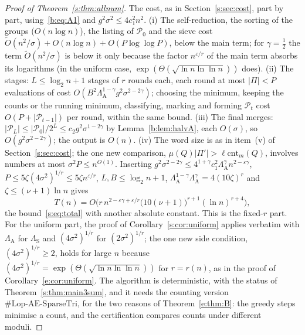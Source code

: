 \documentclass[11pt]{article}
\theoremstyle{definition}
\theoremstyle{remark}
\newcommand{\Lop}{\mathrm{Lop}\text{-}\allowbreak\mathrm{AE}\text{-}\allowbreak\mathrm{SparseTri}}
\newcommand{\cnt}{\mathrm{cnt}}
\newcommand{\Pq}{\mathcal{P}}
\begin{document}
\begin{proof}[Proof of Theorem~\ref{s:thm:allnum}]
The cost, as in Section~\ref{s:sec:cost}, part by part, using~\eqref{b:eq:A1} and $g^2\sigma^2\le4c_1^2n^2$. (i) The self-reduction, the sorting of the groups ($O(n\log n)$), the listing of $\Pq_0$ and the sieve cost $\tilde O(n^2/\sigma)+O(n\log n)+O(P\log\log P)$, below the main term; for $\gamma=\frac12$ the term $\tilde O(n^2/\sigma)$ is below it only because the factor $n^{\varepsilon/r}$ of the main term absorbs its logarithms (in the uniform case, $\exp(\Theta(\sqrt{\ln n\ln\ln n}))$ does). (ii) The stages: $L\le\log_2n+1$ stages of $r$ rounds each, each round at most $|\Pi|<P$ evaluations of cost $O(B^2\Lambda_{\mathrm A}^{1-\gamma}g^2\sigma^{2-2\gamma})$; choosing the minimum, keeping the counts or the running minimum, classifying, marking and forming $\Pq_t$ cost $O(P+|\Pq_{t-1}|)$ per round, within the same bound. (iii) The final merges: $|\Pq_L|\le|\Pq_0|/2^L\le c_2g^2\sigma^{1-2\gamma}$ by Lemma~\ref{b:lem:halvA}, each $O(\sigma)$, so $O(g^2\sigma^{2-2\gamma})$; the output is $O(n)$. (iv) The word size is as in item~(v) of Section~\ref{s:sec:cost}; the one new comparison, $\mu(Q)|\Pi'|>\ell\cnt_m(Q)$, involves numbers at most $\sigma^2P\le n^{O(1)}$. Inserting $g^2\sigma^{2-2\gamma}\le4^{1+\gamma}c_1^2\Lambda_{\mathrm A}^\gamma n^{2-\varepsilon\gamma}$, $P\le5\zeta(4\sigma^2)^{1/r}\le5\zeta n^{\varepsilon/r}$, $L,B\le\log_2n+1$, $\Lambda_{\mathrm A}^{1-\gamma}\Lambda_{\mathrm A}^\gamma=4(10\zeta)^r$ and $\zeta\le(\nu+1)\ln n$ gives
\begin{equation}\label{b:eq:A2}
T(n)=O\Big(r\,n^{2-\varepsilon\gamma+\varepsilon/r}\big(10(\nu+1)\big)^{r+1}(\ln n)^{r+4}\Big),
\end{equation}
the bound~\eqref{s:eq:total} with another absolute constant. This is the fixed-$r$ part. For the uniform part, the proof of Corollary~\ref{s:cor:uniform} applies verbatim with $\Lambda_{\mathrm A}$ for $\Lambda_{\mathrm S}$ and $(4\sigma^2)^{1/r}$ for $(2\sigma^2)^{1/r}$; the one new side condition, $(4\sigma^2)^{1/r}\ge2$, holds for large $n$ because $(4\sigma^2)^{1/r}=\exp(\Theta(\sqrt{\ln n\ln\ln n}))$ for $r=r(n)$, as in the proof of Corollary~\ref{e:cor:uniform}. The algorithm is deterministic, with the status of Theorem~\ref{s:thm:main3sum}, and it needs the counting version $\#\Lop$, for the two reasons of Theorem~\ref{e:thm:B}: the greedy steps minimise a count, and the certification compares counts under different moduli.
\end{proof}
\end{document}
